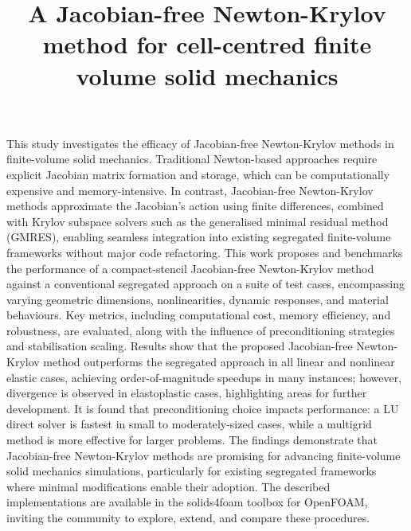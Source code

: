\documentclass[sn-mathphys,Numbered]{sn-jnl}%
\begin{document}
\title[Article Title]{A Jacobian-free Newton-Krylov method for cell-centred finite volume solid mechanics}

\author*[1,2,3]{ }
\author[1,2,3]{ }
\author[4]{ }
\author[4]{ }




\abstract
{
This study investigates the efficacy of Jacobian-free Newton-Krylov methods in finite-volume solid mechanics. Traditional Newton-based approaches require explicit Jacobian matrix formation and storage, which can be computationally expensive and memory-intensive.
In contrast, Jacobian-free Newton-Krylov methods approximate the Jacobian’s action using finite differences, combined with Krylov subspace solvers such as the generalised minimal residual method (GMRES), enabling seamless integration into existing segregated finite-volume frameworks without major code refactoring.
This work proposes and benchmarks the performance of a compact-stencil Jacobian-free Newton-Krylov method against a conventional segregated approach on a suite of test cases, encompassing varying geometric dimensions, nonlinearities, dynamic responses, and material behaviours.
Key metrics, including computational cost, memory efficiency, and robustness, are evaluated, along with the influence of preconditioning strategies and stabilisation scaling.
Results show that the proposed Jacobian-free Newton-Krylov method outperforms the segregated approach in all linear and nonlinear elastic cases, achieving order-of-magnitude speedups in many instances; however, divergence is observed in elastoplastic cases, highlighting areas for further development.
It is found that preconditioning choice impacts performance: a LU direct solver is fastest in small to moderately-sized cases, while a multigrid method is more effective for larger problems.
The findings demonstrate that Jacobian-free Newton-Krylov methods are promising for advancing finite-volume solid mechanics simulations, particularly for existing segregated frameworks where minimal modifications enable their adoption.
The described implementations are available in the solids4foam toolbox for OpenFOAM, inviting the community to explore, extend, and compare these procedures.
}
\end{document}
